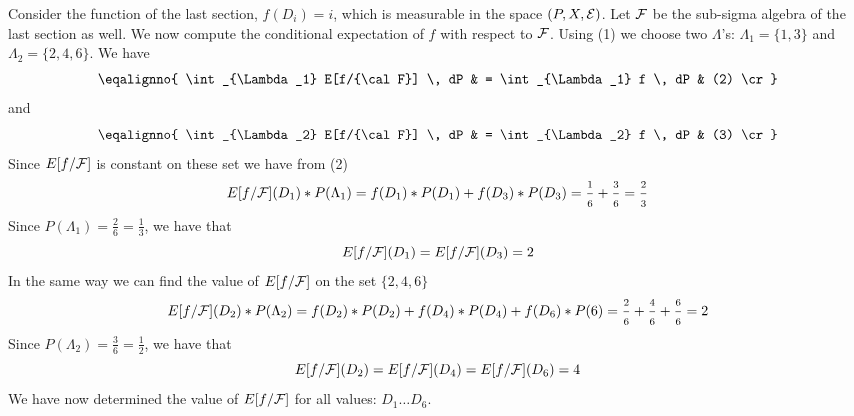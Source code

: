 Consider the function of the last section, $f(D_i) = i$, which is measurable in the 
space $(P,X,{\cal E})$. Let ${\cal F}$ be the sub-sigma algebra of the last section as well.
We now compute the conditional expectation of $f$ with respect to ${\cal F}$.
Using (1) we choose two $\Lambda$'s: $\Lambda_1 = \{1,3\}$ and $\Lambda_2 = \{2,4,6\}$. 
We have
$$
\eqalignno{
\int_{\Lambda_1} E[f/{\cal F}] \, dP & 
= \int_{\Lambda_1} f \, dP & (2) \cr
}
$$
and
$$
\eqalignno{
\int_{\Lambda_2} E[f/{\cal F}] \, dP & 
= \int_{\Lambda_2} f \, dP & (3) \cr
}
$$
Since 
$E[f/{\cal F}]$ is constant on these set we have from (2)
$$
E[f/{\cal F}](D_1) * P(\Lambda_1) = f(D_1) * P(D_1) + f(D_3) * P(D_3) 
= \frac{1}{6} + \frac{3}{6} = \frac{2}{3}
$$
Since $P(\Lambda_1) = \frac{2}{6} = \frac{1}{3}$, we have that 
$$
E[f/{\cal F}](D_1) = E[f/{\cal F}](D_3) = 2
$$
In the same way we can find the value of $E[f/{\cal F}]$ on the set $\{2,4,6\}$
$$
E[f/{\cal F}](D_2) * P(\Lambda_2) = f(D_2) * P(D_2) + f(D_4) * P(D_4) + f(D_6) * P(6) 
= \frac{2}{6} + \frac{4}{6} + \frac{6}{6} = 2
$$
Since $P(\Lambda_2) = \frac{3}{6} = \frac{1}{2}$, we have that 
$$
E[f/{\cal F}](D_2) = E[f/{\cal F}](D_4) = E[f/{\cal F}](D_6) = 4
$$
We have now determined the value of $E[f/{\cal F}]$ for all values: $D_1\ldots D_6$.


\bye


